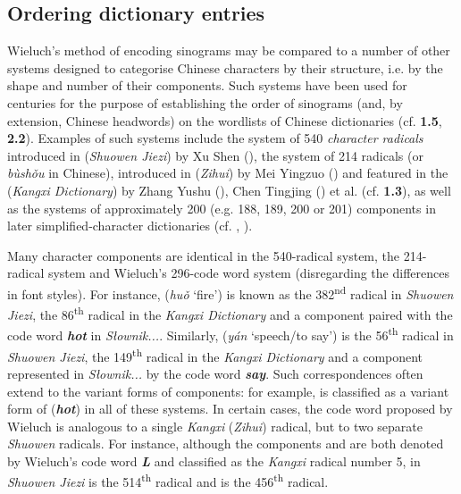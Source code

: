 \documentclass[output=paper,colorlinks,citecolor=brown,arabicfont,chinesefont]{langscibook}
\begin{document}
\subsection{Ordering dictionary entries}

Wieluch's method of encoding sinograms may be compared to a number of other systems designed to categorise Chinese characters by their structure, i.e. by the shape and number of their components. Such systems have been used for centuries for the purpose of establishing the order of sinograms (and, by extension, Chinese headwords) on the wordlists of Chinese dictionaries (cf. \textbf{1.5}, \textbf{2.2}). Examples of such systems include the system of 540 \emph{character radicals} introduced in {} (\emph{Shuowen Jiezi}) by Xu Shen ({}), the system of 214 radicals (or {} \emph{bùshǒu} in Chinese), introduced in {} (\emph{Zihui}) by Mei Yingzuo ({}) and featured in the {} (\emph{Kangxi Dictionary}) by Zhang Yushu ({}), Chen Tingjing ({}) et al. (cf. \textbf{1.3}), as well as the systems of approximately 200 (e.g. 188, 189, 200 or 201) components in later simplified-character dictionaries (cf. \citealt[531-539]{Cheung_kam-siu2016}, \citealt[545-551]{Huang_chu-ren2016}).

Many character components are identical in the 540-radical system, the 214-radical system and Wieluch's 296-code word system (disregarding the differences in font styles). For instance, {} (\emph{huǒ} ‘fire’) is known as the 382\textsuperscript{nd} radical in \emph{Shuowen Jiezi}, the 86\textsuperscript{th} radical in the \emph{Kangxi Dictionary} and a component paired with the code word \textbf{\emph{hot}} in \emph{Słownik...}. Similarly, {} (\emph{yán} ‘speech/to say’) is the 56\textsuperscript{th} radical in \emph{Shuowen Jiezi}, the 149\textsuperscript{th} radical in the \emph{Kangxi Dictionary} and a component represented in \emph{Słownik...} by the code word \textbf{\emph{say}}. Such correspondences often extend to the variant forms of components: for example, {} is classified as a variant form of {} (\textbf{\emph{hot}}) in all of these systems. In certain cases, the code word proposed by Wieluch is analogous to a single \emph{Kangxi} (\emph{Zihui}) radical, but to two separate \emph{Shuowen} radicals. For instance, although the components {} and {} are both denoted by Wieluch's code word \textbf{\emph{L}} and classified as the \emph{Kangxi} radical number 5, in \emph{Shuowen Jiezi} {} is the 514\textsuperscript{th} radical and {} is the 456\textsuperscript{th} radical. 
\end{document}
